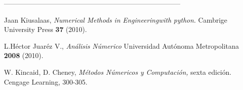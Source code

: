 \documentclass[10pt,a4paper]{article}
\begin{document}
\begin{center}
 -----------------------------------------------------------------------------
\end{center}
\begin{multicols}{2}
\begin{list}{}{\setlength{\topsep}{0mm}\setlength{\itemsep}{0mm}%
\setlength{\parsep}{0mm}\setlength{\leftmargin}{4mm}}
%
\small
\item[1.] Jaan Kiusalaas, \textit{Numerical Methods in Engineering\linebreak with python.} Cambrige University Press \textbf{37} (2010).
\item[2.] L.Héctor Juaréz V., \textit{Análisis Númerico} Universidad Autónoma Metropolitana \textbf{2008} (2010).
\item[3.] W. Kincaid, D. Cheney, \textit{Métodos Númericos y Computación,} sexta edición. Cengage Learning, 300-305.
%
\end{list}
\end{multicols}
\end{document}
